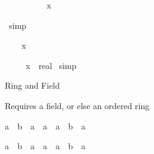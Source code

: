 \begin{isabellebody}
%
\begin{isamarkuptxt}%
\begin{isabelle}%
\ {}{\isachardot}\ {}\ {\isacharslash}\ {}\ {\isacharasterisk}\ {\isacharparenleft}{}\ {\isacharslash}\ {}{}{\isacharparenright}\ {\isacharless}\ x%
\end{isabelle}%
\end{isamarkuptxt}%
\isamarkuptrue%
\ simp\isamarkupfalse%
%
\begin{isamarkuptxt}%
\begin{isabelle}%
\ {}{\isachardot}\ {}\ {\isacharless}\ x\ {\isacharasterisk}\ {}%
\end{isabelle}%
\end{isamarkuptxt}%
\isamarkuptrue%
\isanewline
\isanewline
\isamarkupfalse%
\ {\isachardoublequote}{\isacharparenleft}{}{\isacharslash}{}{\isacharparenright}\ {\isacharasterisk}\ {\isacharparenleft}{}{}{\isacharcircum}{}{}{\isacharparenright}\ {\isacharless}\ {\isacharparenleft}x\ {\isacharcolon}{\isacharcolon}\ real{\isacharparenright}{\isachardoublequote}\isanewline
\isamarkupfalse%
\ simp\ \isanewline
\isamarkupfalse%
\isamarkupfalse%
%
\begin{isamarkuptext}%
Ring and Field

Requires a field, or else an ordered ring

\begin{isabelle}%
{\isacharparenleft}a\ {\isacharasterisk}\ b\ {\isacharequal}\ {\isacharparenleft}{}{\isasymColon}{\isacharprime}a{\isacharparenright}{\isacharparenright}\ {\isacharequal}\ {\isacharparenleft}a\ {\isacharequal}\ {\isacharparenleft}{}{\isasymColon}{\isacharprime}a{\isacharparenright}\ {\isasymor}\ b\ {\isacharequal}\ {\isacharparenleft}{}{\isasymColon}{\isacharprime}a{\isacharparenright}{\isacharparenright}%
\end{isabelle}

\begin{isabelle}%
{\isacharparenleft}a\ {\isacharasterisk}\ b\ {\isacharequal}\ {\isacharparenleft}{}{\isasymColon}{\isacharprime}a{\isacharparenright}{\isacharparenright}\ {\isacharequal}\ {\isacharparenleft}a\ {\isacharequal}\ {\isacharparenleft}{}{\isasymColon}{\isacharprime}a{\isacharparenright}\ {\isasymor}\ b\ {\isacharequal}\ {\isacharparenleft}{}{\isasymColon}{\isacharprime}a{\isacharparenright}{\isacharparenright}%
\end{isabelle}


\end{isamarkuptext}
\end{isabellebody}
